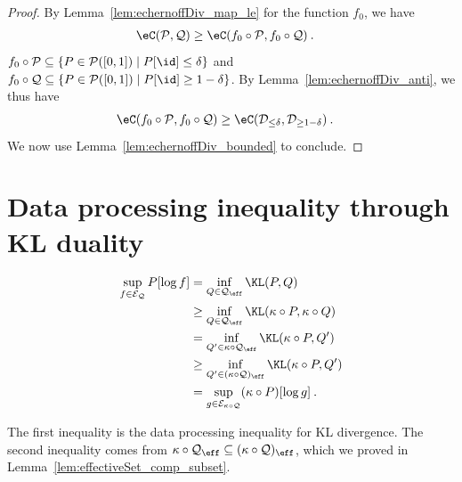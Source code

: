\begin{proof}\leanok
By Lemma~\ref{lem:echernoffDiv_map_le} for the function $f_0$, we have
\begin{align*}
  \eC(\mathcal{P}, \mathcal{Q})
  &\ge \eC(f_0 \circ \mathcal{P}, f_0 \circ \mathcal{Q})
  \: .
\end{align*}
$f_0 \circ \mathcal{P} \subseteq \{P \in \mathcal{P}([0,1]) \mid P[\id] \le \delta\}$ and $f_0 \circ \mathcal{Q} \subseteq \{P \in \mathcal{P}([0,1]) \mid P[\id] \ge 1 - \delta\}$.
By Lemma~\ref{lem:echernoffDiv_anti}, we thus have
\begin{align*}
  \eC(f_0 \circ \mathcal{P}, f_0 \circ \mathcal{Q})
  &\ge \eC(\mathcal{D}_{\le \delta}, \mathcal{D}_{\ge 1 - \delta})
  \: .
\end{align*}
We now use Lemma~\ref{lem:echernoffDiv_bounded} to conclude.
\end{proof}


\section{Data processing inequality through KL duality}

\begin{align*}
  \sup_{f \in \mathcal{E}_{\mathcal{Q}}} P[\log f]
  &= \inf_{Q \in \mathcal{Q}_{\eff}} \KL(P, Q)
  \\
  &\ge \inf_{Q \in \mathcal{Q}_{\eff}} \KL(\kappa \circ P, \kappa \circ Q)
  \\
  &= \inf_{Q' \in \kappa \circ \mathcal{Q}_{\eff}} \KL(\kappa \circ P, Q')
  \\
  &\ge \inf_{Q' \in (\kappa \circ \mathcal{Q})_{\eff}} \KL(\kappa \circ P, Q')
  \\
  &= \sup_{g \in \mathcal{E}_{\kappa \circ \mathcal{Q}}} (\kappa \circ P)[\log g]
  \: .
\end{align*}

The first inequality is the data processing inequality for KL divergence.
The second inequality comes from $\kappa \circ \mathcal{Q}_{\eff} \subseteq (\kappa \circ \mathcal{Q})_{\eff}$, which we proved in Lemma~\ref{lem:effectiveSet_comp_subset}.


